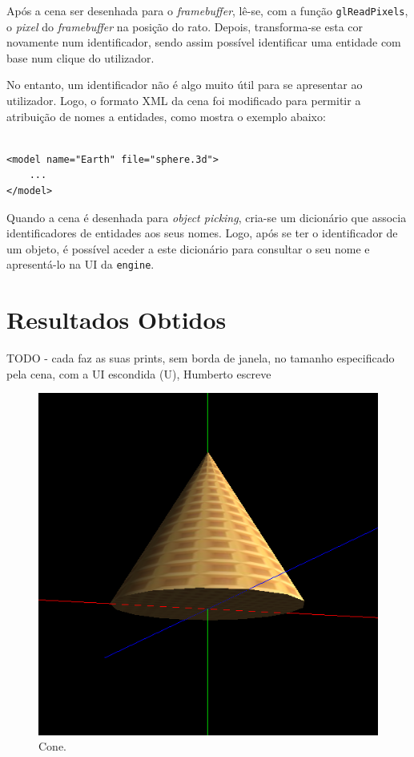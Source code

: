 \documentclass[12pt, a4paper]{article}
\begin{document}
Após a cena ser desenhada para o \emph{framebuffer}, lê-se, com a função \texttt{glReadPixels}, o
\emph{pixel} do \emph{framebuffer} na posição do rato. Depois, transforma-se esta cor novamente num
identificador, sendo assim possível identificar uma entidade com base num clique do utilizador.

No entanto, um identificador não é algo muito útil para se apresentar ao utilizador. Logo, o formato
XML da cena foi modificado para permitir a atribuição de nomes a entidades, como mostra o exemplo
abaixo:

\begin{lstlisting}

<model name="Earth" file="sphere.3d">
    ...
</model>
\end{lstlisting}

Quando a cena é desenhada para \emph{object picking}, cria-se um dicionário que associa
identificadores de entidades aos seus nomes. Logo, após se ter o identificador de um objeto, é
possível aceder a este dicionário para consultar o seu nome e apresentá-lo na UI da \texttt{engine}.

\section{Resultados Obtidos}

{\color{red} TODO - cada faz as suas prints, sem borda de janela, no tamanho especificado pela cena,
com a UI escondida (U), Humberto escreve}

\begin{figure}[H]
    \centering
    \includegraphics[width=\textwidth]{res/phase4/Cone.png}
    \caption{Cone.}
\end{figure}
\end{document}
